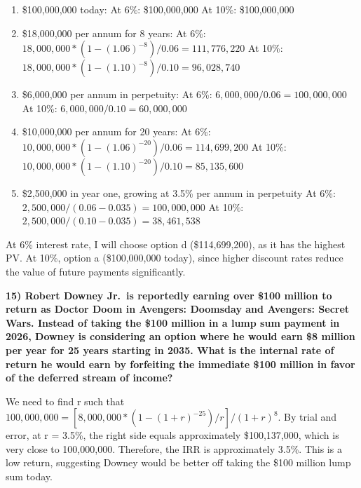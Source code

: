 \documentclass[
  12pt,
]{article}
\providecommand{\tightlist}{%
  \setlength{\itemsep}{0pt}\setlength{\parskip}{0pt}}
\begin{document}
\begin{enumerate}
\def\labelenumi{\alph{enumi}.}
\tightlist
\item
  \$100,000,000 today: At 6\%: \$100,000,000 At 10\%: \$100,000,000
\item
  \$18,000,000 per annum for 8 years: At 6\%:
  \(18,000,000 * (1 - (1.06)^{-8}) / 0.06 = 111,776,220\) At 10\%:
  \(18,000,000 * (1 - (1.10)^{-8}) / 0.10 = 96,028,740\)
\item
  \$6,000,000 per annum in perpetuity: At 6\%:
  \(6,000,000 / 0.06 = 100,000,000\) At 10\%:
  \(6,000,000 / 0.10 = 60,000,000\)
\item
  \$10,000,000 per annum for 20 years: At 6\%:
  \(10,000,000 * (1 - (1.06)^{-20}) / 0.06 = 114,699,200\) At 10\%:
  \(10,000,000 * (1 - (1.10)^{-20}) / 0.10 = 85,135,600\)
\item
  \$2,500,000 in year one, growing at 3.5\% per annum in perpetuity At
  6\%: \(2,500,000 / (0.06 - 0.035) = 100,000,000\) At 10\%:
  \(2,500,000 / (0.10 - 0.035) = 38,461,538\)
\end{enumerate}

At 6\% interest rate, I will choose option d (\$114,699,200), as it has
the highest PV. At 10\%, option a (\$100,000,000 today), since higher
discount rates reduce the value of future payments significantly.

\textbf{15) Robert Downey Jr.~is reportedly earning over \$100 million
to return as Doctor Doom in Avengers: Doomsday and Avengers: Secret
Wars. Instead of taking the \$100 million in a lump sum payment in 2026,
Downey is considering an option where he would earn \$8 million per year
for 25 years starting in 2035. What is the internal rate of return he
would earn by forfeiting the immediate \$100 million in favor of the
deferred stream of income?}

We need to find r such that
\(100,000,000 = [8,000,000 * (1 - (1+r)^{-25}) / r] / (1+r)^8\). By
trial and error, at r = 3.5\%, the right side equals approximately
\$100,137,000, which is very close to 100,000,000. Therefore, the IRR is
approximately 3.5\%. This is a low return, suggesting Downey would be
better off taking the \$100 million lump sum today.
\end{document}
